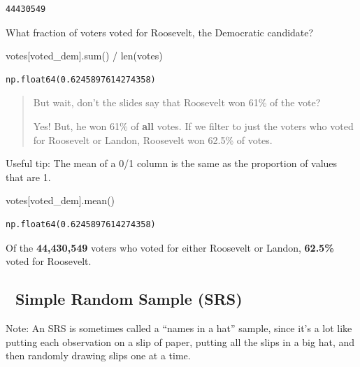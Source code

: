 \documentclass[
  letterpaper,
  DIV=11,
  numbers=noendperiod]{scrreprt}
\newenvironment{Shaded}{\begin{snugshade}}{\end{snugshade}}
\newcommand{\BuiltInTok}[1]{\textcolor[rgb]{0.00,0.23,0.31}{#1}}
\newcommand{\NormalTok}[1]{\textcolor[rgb]{0.00,0.23,0.31}{#1}}
\newcommand{\OperatorTok}[1]{\textcolor[rgb]{0.37,0.37,0.37}{#1}}
\newcommand{\StringTok}[1]{\textcolor[rgb]{0.13,0.47,0.30}{#1}}
\begin{document}
\begin{verbatim}
44430549
\end{verbatim}

What fraction of voters voted for Roosevelt, the Democratic candidate?

\begin{Shaded}
\begin{Highlighting}[]
\NormalTok{votes[}\StringTok{\textquotesingle{}voted\_dem\textquotesingle{}}\NormalTok{].}\BuiltInTok{sum}\NormalTok{() }\OperatorTok{/} \BuiltInTok{len}\NormalTok{(votes)}
\end{Highlighting}
\end{Shaded}

\begin{verbatim}
np.float64(0.6245897614274358)
\end{verbatim}

\begin{quote}
But wait, don't the slides say that Roosevelt won 61\% of the vote?

Yes! But, he won 61\% of \textbf{all} votes. If we filter to just the
voters who voted for Roosevelt or Landon, Roosevelt won 62.5\% of votes.
\end{quote}

Useful tip: The mean of a 0/1 column is the same as the proportion of
values that are 1.

\begin{Shaded}
\begin{Highlighting}[]
\NormalTok{votes[}\StringTok{\textquotesingle{}voted\_dem\textquotesingle{}}\NormalTok{].mean()}
\end{Highlighting}
\end{Shaded}

\begin{verbatim}
np.float64(0.6245897614274358)
\end{verbatim}

Of the \textbf{44,430,549} voters who voted for either Roosevelt or
Landon, \textbf{62.5\%} voted for Roosevelt.

\subsection{🎩 Simple Random Sample
(SRS)}\label{simple-random-sample-srs}

Note: An SRS is sometimes called a ``names in a hat'' sample, since it's
a lot like putting each observation on a slip of paper, putting all the
slips in a big hat, and then randomly drawing slips one at a time.
\end{document}
